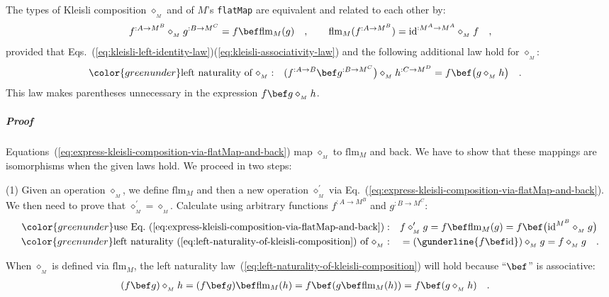 The types of Kleisli composition $\diamond_{_{M}}$ and of $M$\textsf{'}s
\lstinline!flatMap! are equivalent and related to each other by:
\begin{equation}
f^{:A\rightarrow M^{B}}\diamond_{_{M}}g^{:B\rightarrow M^{C}}=f\bef\text{flm}_{M}(g)\quad,\quad\quad\text{flm}_{M}(f^{:A\rightarrow M^{B}})=\text{id}^{:M^{A}\rightarrow M^{A}}\diamond_{_{M}}f\quad,\label{eq:express-kleisli-composition-via-flatMap-and-back}
\end{equation}
provided that Eqs.~(\ref{eq:kleisli-left-identity-law})\textendash (\ref{eq:kleisli-associativity-law})
and the following additional law hold for $\diamond_{_{M}}$:
\begin{align}
{\color{greenunder}\text{left naturality of }\diamond_{_{M}}:}\quad & (f^{:A\rightarrow B}\bef g^{:B\rightarrow M^{C}}\big)\diamond_{_{M}}h^{:C\rightarrow M^{D}}=f\bef\big(g\diamond_{_{M}}h\big)\quad.\label{eq:left-naturality-of-kleisli-composition}
\end{align}
This law makes parentheses unnecessary in the expression $f\bef g\diamond_{_{M}}h$.

\subparagraph{Proof}

Equations~(\ref{eq:express-kleisli-composition-via-flatMap-and-back})
map $\diamond_{_{M}}$ to $\text{flm}_{M}$ and back. We have to show
that these mappings are isomorphisms when the given laws hold. We
proceed in two steps:

(1) Given an operation $\diamond_{_{M}}$, we define $\text{flm}_{M}$
and then a new operation $\diamond_{_{M}}^{\prime}$ via Eq.~(\ref{eq:express-kleisli-composition-via-flatMap-and-back}).
We then need to prove that $\diamond_{_{M}}^{\prime}=\diamond_{_{M}}$.
Calculate using arbitrary functions $f^{:A\rightarrow M^{B}}$ and
$g^{:B\rightarrow M^{C}}$:
\begin{align*}
{\color{greenunder}\text{use Eq.~(\ref{eq:express-kleisli-composition-via-flatMap-and-back})}:}\quad & f\diamond_{_{M}}^{\prime}g=f\bef\text{flm}_{M}(g)=f\bef\big(\text{id}^{M^{B}}\diamond_{_{M}}g\big)\\
{\color{greenunder}\text{left naturality~(\ref{eq:left-naturality-of-kleisli-composition}) of }\diamond_{_{M}}:}\quad & =(\gunderline{f\bef\text{id}})\diamond_{_{M}}g=f\diamond_{_{M}}g\quad.
\end{align*}

When $\diamond_{_{M}}$ is defined via $\text{flm}_{M}$, the left
naturality law~(\ref{eq:left-naturality-of-kleisli-composition})
will hold because \textsf{``}$\bef$\textsf{''} is associative:
\begin{align*}
 & (f\bef g)\diamond_{_{M}}h=(f\bef g)\bef\text{flm}_{M}(h)=f\bef(g\bef\text{flm}_{M}(h))=f\bef(g\diamond_{_{M}}h)\quad.
\end{align*}

